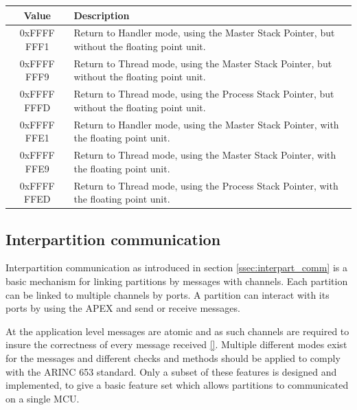 \begin{table}[H]

	\centering
	\begin{tabular}{|c|p{10cm}|}
		\hline
		Value			&	Description 	\\
		\hline
		0xFFFF FFF1 	&	Return to Handler mode, using the Master Stack Pointer, but without the floating point unit.	\\
		\hline
		0xFFFF FFF9		&	Return to Thread mode, using the Master Stack Pointer, but without the floating point unit.		\\
		\hline
		0xFFFF FFFD		&	Return to Thread mode, using the Process Stack Pointer, but without the floating point unit.	\\
		\hline
		0xFFFF FFE1		&	Return to Handler mode, using the Master Stack Pointer, with the floating point unit.			\\
		\hline
		0xFFFF FFE9		&	Return to Thread mode, using the Master Stack Pointer, with the floating point unit.			\\
		\hline
		0xFFFF FFED		&	Return to Thread mode, using the Process Stack Pointer, with the floating point unit.			\\
		\hline
	\end{tabular}
	\label{tab:exc-return}
\end{table}

\subsection{Interpartition communication}
\label{design:interpart_comm}
Interpartition communication as introduced in section \ref{ssec:interpart_comm} is a basic mechanism for linking partitions by messages with channels.
Each partition can be linked to multiple channels by ports.
A partition can interact with its ports by using the APEX and send or receive messages.

At the application level messages are atomic and as such channels are required to insure the correctness of every message received \ref{}.
Multiple different modes exist for the messages and different checks and methods should be applied to comply with the ARINC 653 standard.
Only a subset of these features is designed and implemented,
to give a basic feature set which allows partitions to communicated on a single MCU.

